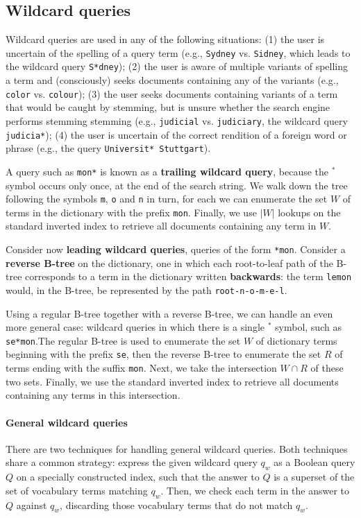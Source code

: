 \documentclass[letterpaper,11pt]{article}
\newcommand{\code}[1]{\texttt{#1}}
\begin{document}
\subsection{Wildcard queries}
Wildcard queries are used in any of the following situations: (1) the user is uncertain of the spelling of a query term (e.g., \code{Sydney} vs. \code{Sidney}, which leads to the wildcard query \code{S*dney}); (2) the user is aware of multiple variants of spelling a term and (consciously) seeks documents containing any of the variants (e.g., \code{color} vs. \code{colour}); (3) the user seeks documents containing variants of a term that would be caught by stemming, but is unsure whether the search engine performs stemming stemming (e.g., \code{judicial} vs. \code{judiciary}, the wildcard query \code{judicia*}); (4) the user is uncertain of the correct rendition of a foreign word or phrase (e.g., the query \code{Universit* Stuttgart}).

A query such as \code{mon*} is known as a \textbf{trailing wildcard query}, because the $^*$ symbol occurs only once, at the end of the search string. We walk down the tree following the symbols \code{m}, \code{o} and \code{n} in turn, for each we can enumerate the set $W$ of terms in the dictionary with the prefix \code{mon}. Finally, we use $|W|$ lookups on the standard inverted index to retrieve all documents containing any term in $W$. 

Consider now \textbf{leading wildcard queries}, queries of the form \code{*mon}. Consider a \textbf{reverse B-tree} on the dictionary, one in which each root-to-leaf path of the B-tree corresponds to a term in the dictionary written \textbf{backwards}: the term \code{lemon} would, in the B-tree, be represented by the path \code{root-n-o-m-e-l}.

Using a regular B-tree together with a reverse B-tree, we can handle an even more general case: wildcard queries in which there is a single $^*$ symbol, such as \code{se*mon}.The regular B-tree is used to enumerate the set $W$ of dictionary terms beginning with the prefix \code{se}, then the reverse B-tree to enumerate the set $R$ of terms ending with the suffix \code{mon}. Next, we take the intersection $W \cap R$ of these two sets. Finally, we use the standard inverted index to retrieve all documents containing any terms in this intersection.

\paragraph{General wildcard queries}
There are two techniques for handling general wildcard queries. Both techniques share a common strategy: express the given wildcard query $q_w$ as a Boolean query $Q$ on a specially constructed index, such that the answer to $Q$ is a superset of the set of vocabulary terms matching $q_w$. Then, we check each term in the answer to $Q$ against $q_w$, discarding those vocabulary terms that do not match $q_w$.
\end{document}
